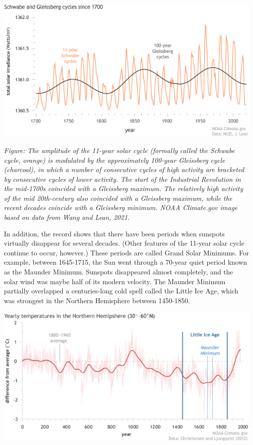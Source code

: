 \documentclass[
]{book}
\begin{document}
\includegraphics{fig/Schwabe_Gleissberg_1700-2020.jpg}

\emph{Figure: The amplitude of the 11-year solar cycle (formally called the Schwabe cycle, orange) is modulated by the approximately 100-year Gleissberg cycle (charcoal), in which a number of consecutive cycles of high activity are bracketed by consecutive cycles of lower activity. The start of the Industrial Revolution in the mid-1700s coincided with a Gleissberg maximum. The relatively high activity of the mid 20th-century also coincided with a Gleissberg maximum, while the recent decades coincide with a Gleissberg minimum. NOAA Climate.gov image based on data from Wang and Lean, 2021.}

In addition, the record shows that there have been periods when sunspots virtually disappear for several decades. (Other features of the 11-year solar cycle continue to occur, however.) These periods are called Grand Solar Minimums. For example, between 1645-1715, the Sun went through a 70-year quiet period known as the Maunder Minimum. Sunspots disappeared almost completely, and the solar wind was maybe half of its modern velocity. The Maunder Minimum partially overlapped a centuries-long cold spell called the Little Ice Age, which was strongest in the Northern Hemisphere between 1450­-1850.

\includegraphics{fig/NH_temp_2000yrs.jpg}
\end{document}
